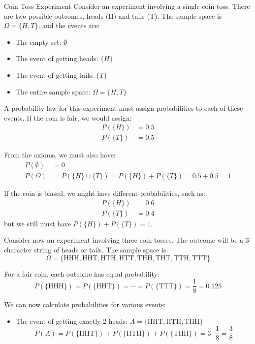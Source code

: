 \begin{itemize}
\begin{exampleboxbreak}{Coin Toss Experiment}
Consider an experiment involving a single coin toss. There are two possible outcomes, heads (H) and tails (T). The sample space is $\Omega = \{H, T\}$, and the events are:
\begin{itemize}
    \item The empty set: $\emptyset$
    \item The event of getting heads: $\{H\}$
    \item The event of getting tails: $\{T\}$
    \item The entire sample space: $\Omega = \{H, T\}$
\end{itemize}

A probability law for this experiment must assign probabilities to each of these events. If the coin is fair, we would assign:
\begin{align}
P(\{H\}) &= 0.5\\
P(\{T\}) &= 0.5
\end{align}

From the axioms, we must also have:
\begin{align}
P(\emptyset) &= 0\\
P(\Omega) &= P(\{H\} \cup \{T\}) = P(\{H\}) + P(\{T\}) = 0.5 + 0.5 = 1
\end{align}

If the coin is biased, we might have different probabilities, such as:
\begin{align}
P(\{H\}) &= 0.6\\
P(\{T\}) &= 0.4
\end{align}
but we still must have $P(\{H\}) + P(\{T\}) = 1$. 


Consider now an experiment involving three coin tosses. The outcome will be a 3-character string of heads or tails. The sample space is:
\[\Omega = \{\text{HHH}, \text{HHT}, \text{HTH}, \text{HTT}, \text{THH}, \text{THT}, \text{TTH}, \text{TTT}\}\]

For a fair coin, each outcome has equal probability:
\[P(\{\text{HHH}\}) = P(\{\text{HHT}\}) = \cdots = P(\{\text{TTT}\}) = \frac{1}{8} = 0.125\]

We can now calculate probabilities for various events:
\begin{itemize}
    \item The event of getting exactly 2 heads: $A = \{\text{HHT}, \text{HTH}, \text{THH}\}$
    \[P(A) = P(\{\text{HHT}\}) + P(\{\text{HTH}\}) + P(\{\text{THH}\}) = 3 \cdot \frac{1}{8} = \frac{3}{8}\]
    

\end{itemize}
\end{exampleboxbreak}
\end{itemize}
